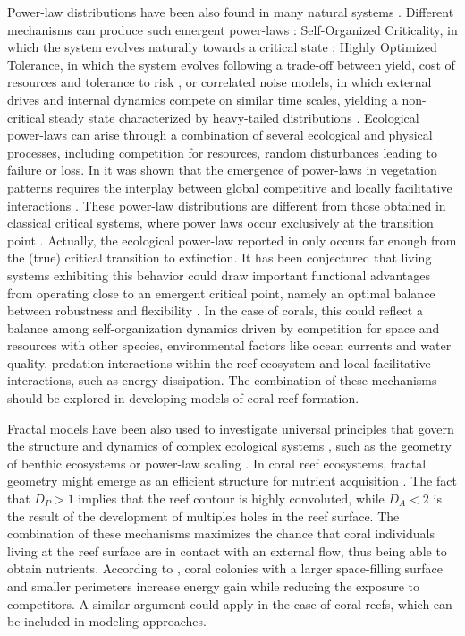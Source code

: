Power-law distributions have been also found in many natural systems
\cite{SOLE1995, west2000scaling, Brown2002, Chave2003, Marquet2005,
    Corral2019}.
Different mechanisms can produce such emergent power-laws
\cite{Markovic2014}: Self-Organized Criticality, in which the system evolves
naturally towards a critical state \cite{Per1988}; Highly Optimized Tolerance,
in which the system evolves following a trade-off between yield, cost of
resources and tolerance to risk \cite{Carlson1999,Carlson2000}, or correlated
noise models, in which external drives and internal dynamics compete on similar
time scales, yielding a non-critical steady state characterized by heavy-tailed
distributions \cite{Newman1996}. Ecological power-laws can arise through a
combination of several ecological and physical processes, including competition
for resources, random disturbances leading to failure or loss. In
\cite{Scanlon2007, Kefi2007} it was shown that the emergence of power-laws in
vegetation patterns requires the interplay between global competitive and
locally facilitative interactions \cite{Scanlon2007, Kefi2007}. These power-law
distributions are different from those obtained in classical critical systems,
where power laws occur exclusively at the transition point
\cite{Wilson1979,Binney1995}. Actually, the ecological power-law reported in
\cite{Kefi2007} only occurs far enough from the (true) critical transition to
extinction. It has been conjectured that living systems exhibiting this
behavior could draw important functional advantages from operating close to an
emergent critical point, namely an optimal balance between robustness and
flexibility \cite{Munoz2018}. In the case of corals, this could reflect a
balance among self-organization dynamics driven by competition for space and
resources with other species, environmental factors like ocean currents and
water quality, predation interactions within the reef ecosystem and local
facilitative interactions, such as energy dissipation. The combination of these
mechanisms should be explored in developing models of coral reef formation.

Fractal models have been also used to investigate universal principles that
govern the structure and dynamics of complex ecological systems
\cite{Brown2002}, such as the geometry of benthic ecosystems or power-law
scaling \cite{Schmid1999}. In coral reef ecosystems, fractal geometry might
emerge as an efficient structure for nutrient acquisition \cite{Sous2020}. The
fact that $D_P>1$ implies that the reef contour is highly convoluted, while
$D_A<2$ is the result of the development of multiples holes in the reef
surface. The combination of these mechanisms maximizes the chance that coral
individuals living at the reef surface are in contact with an external flow,
thus being able to obtain nutrients. According to \cite{George2021}, coral
colonies with a larger space-filling surface and smaller perimeters increase
energy gain while reducing the exposure to competitors. A similar argument
could apply in the case of coral reefs, which can be included in modeling
approaches.


